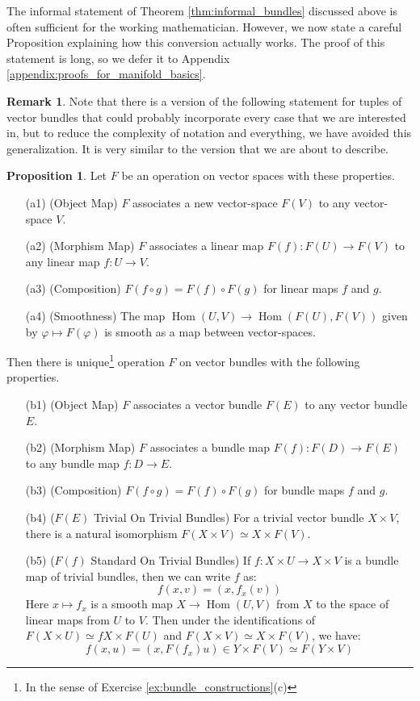 \documentclass[12pt]{article}
\theoremstyle{definition}
\newtheorem{proposition}[theorem]{Proposition}
\newtheorem{remark}[theorem]{Remark}
\numberwithin{equation}{section}
\newcommand{\op}{\operatorname}
\begin{document}
The informal statement of Theorem \ref{thm:informal_bundles} discussed above is often sufficient for the working mathematician. However, we now state a careful Proposition explaining how this conversion actually works. The proof of this statement is long, so we defer it to Appendix \ref{appendix:proofs_for_manifold_basics}.

\begin{remark} Note that there is a version of the following statement for tuples of vector bundles that could probably incorporate every case that we are interested in, but to reduce the complexity of notation and everything, we have avoided this generalization. It is very similar to the version that we are about to describe.
\end{remark}

\begin{proposition} \label{prop:general_bundle_operations} Let $F$ be an operation on vector spaces with these properties.
\begin{itemize}
\item[(a1)] (Object Map) $F$ associates a new vector-space $F(V)$ to any vector-space $V$. 
\item[(a2)] (Morphism Map) $F$ associates a linear map $F(f):F(U) \to F(V)$ to any linear map $f:U \to V$. 
\item[(a3)] (Composition) $F(f \circ g) = F(f) \circ F(g)$ for linear maps $f$ and $g$.
\item[(a4)] (Smoothness) The map $\op{Hom}(U,V) \to \op{Hom}(F(U),F(V))$ given by $\varphi \mapsto F(\varphi)$ is smooth as a map between vector-spaces. 
\end{itemize}
Then there is unique\footnote{In the sense of Exercise \ref{ex:bundle_constructions}(c)} operation $F$ on vector bundles with the following properties.
\begin{itemize}
\item[(b1)] (Object Map) $F$ associates a vector bundle $F(E)$ to any vector bundle $E$. 
\item[(b2)] (Morphism Map) $F$ associates a bundle map $F(f):F(D) \to F(E)$ to any bundle map $f:D \to E$. 
\item[(b3)] (Composition) $F(f \circ g) = F(f) \circ F(g)$ for bundle maps $f$ and $g$. 
\item[(b4)] ($F(E)$ Trivial On Trivial Bundles) For a trivial vector bundle $X \times V$, there is a natural isomorphism $F(X \times V) \simeq X \times F(V)$.
\item[(b5)] ($F(f)$ Standard On Trivial Bundles) If $f:X \times U \to X \times V$ is a bundle map of trivial bundles, then we can write $f$ as:
\[
f(x,v) = (x,f_x(v))
\]
Here $x \mapsto f_x$ is a smooth map $X \to \op{Hom}(U,V)$ from $X$ to the space of linear maps from $U$ to $V$. Then under the identifications of $F(X \times U) \simeq fX \times F(U)$ and $F(X \times V) \simeq X \times F(V)$, we have:
\[
f(x,u) = (x,F(f_x)u) \in Y \times F(V) \simeq F(Y \times V)
\]
\end{itemize}
\end{proposition}
\end{document}
